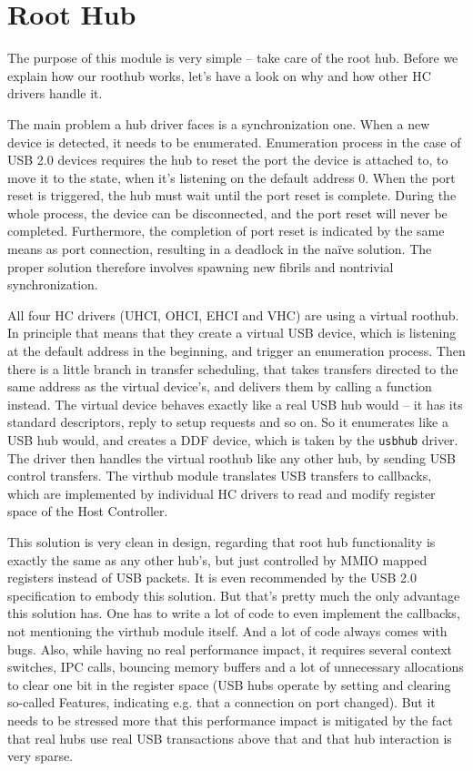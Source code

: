 \section{Root Hub}

The purpose of this module is very simple -- take care of the root hub. Before
we explain how our roothub works, let's have a look on why and how other HC
drivers handle it.

The main problem a hub driver faces is a synchronization one. When a new device
is detected, it needs to be enumerated. Enumeration process in the case of USB 2.0
devices requires the hub to reset the port the device is attached to, to move
it to the  state, when it's listening on the default address 0.
When the port reset is triggered, the hub must wait until the port reset is
complete. During the whole process, the device can be disconnected, and the
port reset will never be completed. Furthermore, the completion of port reset
is indicated by the same means as port connection, resulting in a deadlock in
the na\"ive solution. The proper solution therefore involves spawning new
fibrils and nontrivial synchronization.

All four HC drivers (UHCI, OHCI, EHCI and VHC) are using a virtual roothub. In
principle that means that they create a virtual USB device, which is listening
at the default address in the beginning, and trigger an enumeration process.
Then there is a little branch in transfer scheduling, that takes transfers
directed to the same address as the virtual device's, and delivers them by
calling a function instead. The virtual device behaves exactly like a real USB
hub would -- it has its standard descriptors, reply to setup requests and so
on. So it enumerates like a USB hub would, and creates a DDF device, which is
taken by the \texttt{usbhub} driver. The driver then handles the virtual
roothub like any other hub, by sending USB control transfers. The virthub
module translates USB transfers to callbacks, which are implemented by
individual HC drivers to read and modify register space of the Host Controller.

This solution is very clean in design, regarding that root hub functionality is
exactly the same as any other hub's, but just controlled by MMIO mapped
registers instead of USB packets. It is even recommended by the USB 2.0			%
specification to embody this solution. But that's pretty much the only advantage
this solution has. One has to write a lot of code to even implement the
callbacks, not mentioning the virthub module itself. And a lot of code always
comes with bugs. Also, while having no real performance impact, it requires
several context switches, IPC calls, bouncing memory buffers and a lot of
unnecessary allocations to clear one bit in the register space (USB hubs
operate by setting and clearing so-called Features, indicating e.g. that
a connection on port changed). But it needs to be stressed more that this
performance impact is mitigated by the fact that real hubs use real USB transactions
above that and that hub interaction is very sparse.

